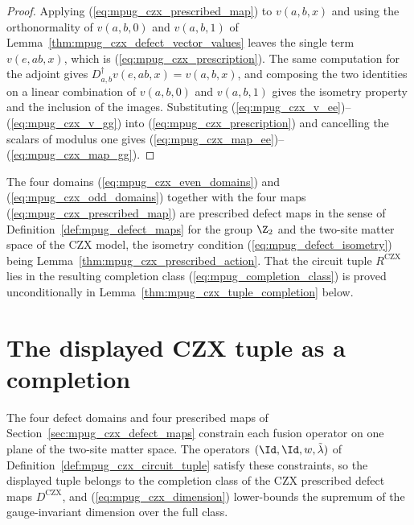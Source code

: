 \begin{proof}\leanok
    Applying (\ref{eq:mpug_czx_prescribed_map}) to $v(a,b,x)$ and using the
    orthonormality of $v(a,b,0)$ and $v(a,b,1)$ of
    Lemma~\ref{thm:mpug_czx_defect_vector_values} leaves the single term
    $v(e,ab,x)$, which is (\ref{eq:mpug_czx_prescription}). The same
    computation for the adjoint gives
    $D_{a,b}^{\dagger}v(e,ab,x)=v(a,b,x)$, and composing the two identities on
    a linear combination of $v(a,b,0)$ and $v(a,b,1)$ gives the isometry
    property and the inclusion of the images. Substituting
    (\ref{eq:mpug_czx_v_ee})--(\ref{eq:mpug_czx_v_gg}) into
    (\ref{eq:mpug_czx_prescription}) and cancelling the scalars of modulus one
    gives (\ref{eq:mpug_czx_map_ee})--(\ref{eq:mpug_czx_map_gg}).
\end{proof}

\begin{definition}
    \label{def:mpug_czx_defect_maps}
    \leanok
    The four domains (\ref{eq:mpug_czx_even_domains}) and
    (\ref{eq:mpug_czx_odd_domains}) together with the four maps
    (\ref{eq:mpug_czx_prescribed_map}) are prescribed defect maps in the sense
    of Definition~\ref{def:mpug_defect_maps} for the group $\Z_2$ and the
    two-site matter space of the CZX model, the isometry condition
    (\ref{eq:mpug_defect_isometry}) being
    Lemma~\ref{thm:mpug_czx_prescribed_action}. That the circuit tuple
    $R^{\mathrm{CZX}}$ lies in the resulting completion class
    (\ref{eq:mpug_completion_class}) is proved unconditionally in
    Lemma~\ref{thm:mpug_czx_tuple_completion} below.
\end{definition}

\section{The displayed CZX tuple as a completion}
\label{sec:mpug_czx_completion}

The four defect domains and four prescribed maps of
Section~\ref{sec:mpug_czx_defect_maps} constrain each fusion operator on one
plane of the two-site matter space. The operators
$(\Id,\Id,w,\tilde\lambda)$ of Definition~\ref{def:mpug_czx_circuit_tuple}
satisfy these constraints, so the displayed tuple belongs to the completion
class of the CZX prescribed defect maps $D^{\mathrm{CZX}}$, and
(\ref{eq:mpug_czx_dimension}) lower-bounds the supremum of the gauge-invariant
dimension over the full class.

